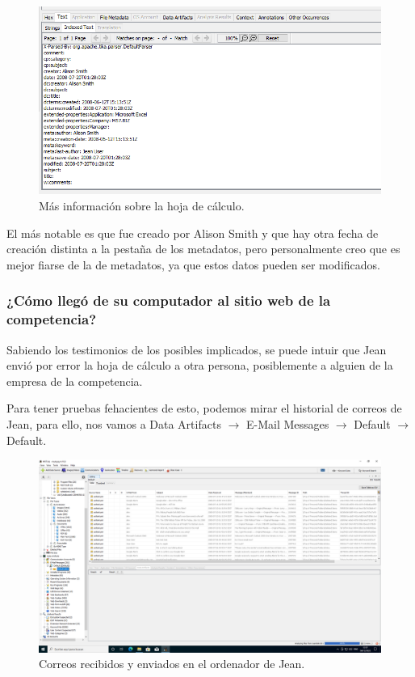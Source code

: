 \documentclass{article}
\begin{document}
\begin{figure}[H]
    \centering
    \includegraphics[width=\textwidth]{imagenes/Windows/Captura de pantalla (7).png}
    \caption{Más información sobre la hoja de cálculo.}
\end{figure}

El más notable es que fue creado por Alison Smith y que hay otra fecha de creación distinta a la pestaña de los metadatos, pero personalmente creo que es mejor fiarse de la de metadatos, ya que estos datos pueden ser modificados.

\newpage

\subsubsection*{¿Cómo llegó de su computador al sitio web de la competencia?}

Sabiendo los testimonios de los posibles implicados, se puede intuir que Jean envió por error la hoja de cálculo a otra persona, posiblemente a alguien de la empresa de la competencia.

\bigskip

Para tener pruebas fehacientes de esto, podemos mirar el historial de correos de Jean, para ello, nos vamos a Data Artifacts $\rightarrow$ E-Mail Messages $\rightarrow$ Default $\rightarrow$ Default.

\begin{figure}[H]
    \centering
    \includegraphics[width=\textwidth]{imagenes/Windows/Captura de pantalla (8).png}
    \caption{Correos recibidos y enviados en el ordenador de Jean.}
\end{figure}
\end{document}
